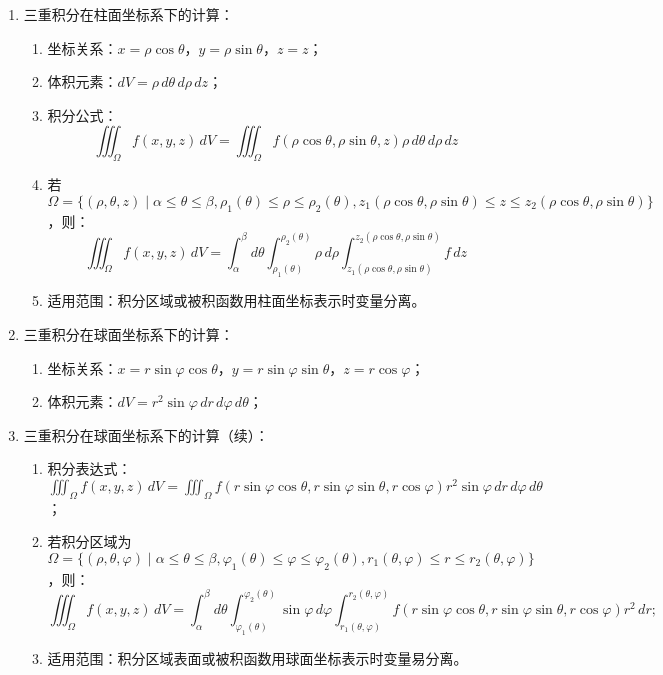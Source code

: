 \documentclass[UTF8]{ctexart}
\theoremstyle{remark}
\begin{document}
\begin{enumerate}
		\item 三重积分在柱面坐标系下的计算：
		\begin{enumerate}
			\item 坐标关系：\(x = \rho \cos\theta\)，\(y = \rho \sin\theta\)，\(z = z\)；
			\item 体积元素：\(dV = \rho \, d\theta \, d\rho \, dz\)；
			\item 积分公式：
			\[
			\iiint_\Omega f(x, y, z) \, dV = \iiint_\Omega f(\rho \cos\theta, \rho \sin\theta, z) \rho \, d\theta \, d\rho \, dz
			\]
			\item 若 \(\Omega = \{(\rho, \theta, z) \mid \alpha \leq \theta \leq \beta, \rho_1(\theta) \leq \rho \leq \rho_2(\theta), z_1(\rho \cos\theta, \rho \sin\theta) \leq z \leq z_2(\rho \cos\theta, \rho \sin\theta)\}\)，则：
			\[
			\iiint_\Omega f(x, y, z) \, dV = \int_\alpha^\beta d\theta \int_{\rho_1(\theta)}^{\rho_2(\theta)} \rho \, d\rho \int_{z_1(\rho \cos\theta, \rho \sin\theta)}^{z_2(\rho \cos\theta, \rho \sin\theta)} f \, dz
			\]
			\item 适用范围：积分区域或被积函数用柱面坐标表示时变量分离。
		\end{enumerate}
		
		\item 三重积分在球面坐标系下的计算：
		\begin{enumerate}
			\item 坐标关系：\(x = r \sin\varphi \cos\theta\)，\(y = r \sin\varphi \sin\theta\)，\(z = r \cos\varphi\)；
			\item 体积元素：\(dV = r^2 \sin\varphi \, dr \, d\varphi \, d\theta\)；
		\end{enumerate}
		
		\item 三重积分在球面坐标系下的计算（续）：
		\begin{enumerate}
			\item 积分表达式：\(\iiint_{\Omega} f(x, y, z) \, dV = \iiint_{\Omega} f(r \sin\varphi \cos\theta, r \sin\varphi \sin\theta, r \cos\varphi) r^2 \sin\varphi \, dr \, d\varphi \, d\theta\)；
			\item 若积分区域为 \(\Omega = \{(\rho, \theta, \varphi) \mid \alpha \leq \theta \leq \beta, \varphi_1(\theta) \leq \varphi \leq \varphi_2(\theta), r_1(\theta, \varphi) \leq r \leq r_2(\theta, \varphi)\}\)，则：
			\[
			\iiint_{\Omega} f(x, y, z) \, dV = \int_{\alpha}^{\beta} d\theta \int_{\varphi_1(\theta)}^{\varphi_2(\theta)} \sin\varphi \, d\varphi \int_{r_1(\theta, \varphi)}^{r_2(\theta, \varphi)} f(r \sin\varphi \cos\theta, r \sin\varphi \sin\theta, r \cos\varphi) r^2 \, dr;
			\]
			\item 适用范围：积分区域表面或被积函数用球面坐标表示时变量易分离。
		\end{enumerate}
		

\end{enumerate}
\end{document}
